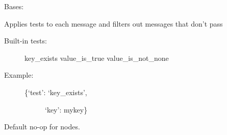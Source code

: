 \documentclass[letterpaper,10pt,english]{sphinxmanual}
\begin{document}

\begin{fulllineitems}
\label{\detokenize{api:nanostream.node.Filter}}
Bases: {\hyperref[\detokenize{api:nanostream.node.NanoNode}]{}}

Applies tests to each message and filters out messages that don’t pass
\begin{description}
\item[{Built-in tests:}] \leavevmode
key\_exists
value\_is\_true
value\_is\_not\_none

\item[{Example:}] \leavevmode\begin{description}
\item[{\{‘test’: ‘key\_exists’,}] \leavevmode
‘key’: mykey\}

\end{description}

\end{description}

\begin{fulllineitems}
\label{\detokenize{api:nanostream.node.Filter.process_item}}
Default no-op for nodes.

\end{fulllineitems}


\end{fulllineitems}

\end{document}
